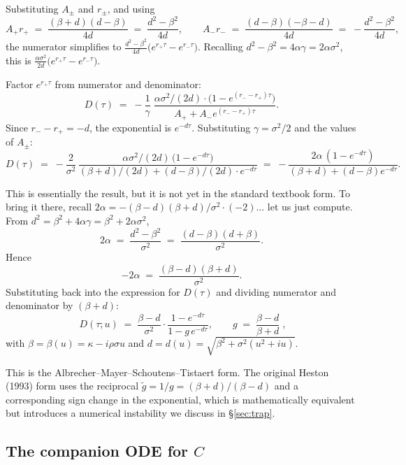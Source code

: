 \documentclass[11pt]{article}
\theoremstyle{plain}
\theoremstyle{definition}
\theoremstyle{remark}
\begin{document}
Substituting \(A_\pm\) and \(r_\pm\), and using
\[
    A_+ r_+ \;=\; \frac{(\beta + d)(d - \beta)}{4 d} \;=\; \frac{d^2 - \beta^2}{4 d}, \qquad
    A_- r_- \;=\; \frac{(d - \beta)(-\beta - d)}{4 d} \;=\; -\frac{d^2 - \beta^2}{4 d},
\]
the numerator simplifies to \(\frac{d^2 - \beta^2}{4 d}\bigl(e^{r_+ \tau} - e^{r_- \tau}\bigr)\). Recalling \(d^2 - \beta^2 = 4\alpha\gamma = 2\alpha\sigma^2\), this is \(\frac{\alpha \sigma^2}{2 d}\bigl(e^{r_+ \tau} - e^{r_- \tau}\bigr)\).

Factor \(e^{r_+ \tau}\) from numerator and denominator:
\[
    D(\tau) \;=\; -\frac{1}{\gamma}\;\frac{\alpha\sigma^2 / (2 d) \cdot \bigl(1 - e^{(r_- - r_+)\tau}\bigr)}{A_+ + A_- e^{(r_- - r_+)\tau}}.
\]
Since \(r_- - r_+ = -d\), the exponential is \(e^{-d\tau}\). Substituting \(\gamma = \sigma^2/2\) and the values of \(A_\pm\):
\[
    D(\tau) \;=\; -\frac{2}{\sigma^2}\,\frac{\alpha\sigma^2/(2d)\,\bigl(1 - e^{-d\tau}\bigr)}{(\beta + d)/(2 d) + (d - \beta)/(2 d) \cdot e^{-d\tau}}
                \;=\; -\frac{2 \alpha \,(1 - e^{-d\tau})}{(\beta + d) + (d - \beta) e^{-d\tau}}.
\]

This is essentially the result, but it is not yet in the standard textbook form. To bring it there, recall \(2\alpha = -(\beta - d)(\beta + d)/\sigma^2 \cdot (-2)\)... let us just compute. From \(d^2 = \beta^2 + 4\alpha\gamma = \beta^2 + 2\alpha\sigma^2\),
\[
    2\alpha \;=\; \frac{d^2 - \beta^2}{\sigma^2} \;=\; \frac{(d - \beta)(d + \beta)}{\sigma^2}.
\]
Hence
\[
    -2\alpha \;=\; \frac{(\beta - d)(\beta + d)}{\sigma^2}.
\]
Substituting back into the expression for \(D(\tau)\) and dividing numerator and denominator by \((\beta + d)\):
\begin{equation}
    \boxed{\;
    D(\tau; u) \;=\; \frac{\beta - d}{\sigma^2} \cdot \frac{1 - e^{-d\tau}}{1 - g\, e^{-d\tau}}, \qquad
    g \;=\; \frac{\beta - d}{\beta + d}\;,                                                                      \label{eq:D-final}
    }
\end{equation}
with \(\beta = \beta(u) = \kappa - i\rho\sigma u\) and \(d = d(u) = \sqrt{\beta^2 + \sigma^2(u^2 + i u)}\).

This is the Albrecher--Mayer--Schoutens--Tistaert form. The original Heston (1993) form uses the reciprocal \(\tilde g = 1/g = (\beta + d)/(\beta - d)\) and a corresponding sign change in the exponential, which is mathematically equivalent but introduces a numerical instability we discuss in \S\ref{sec:trap}.

\subsection{The companion ODE for \(C\)}
\end{document}
